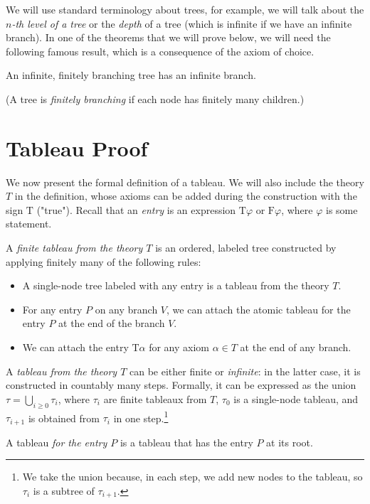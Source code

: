 We will use standard terminology about trees, for example, we will talk about the \emph{$n$-th level of a tree} or the \emph{depth} of a tree (which is infinite if we have an infinite branch). In one of the theorems that we will prove below, we will need the following famous result, which is a consequence of the axiom of choice.

\begin{lemma}
An infinite, finitely branching tree has an infinite branch.
\end{lemma}
\noindent (A tree is \emph{finitely branching} if each node has finitely many children.)


\section{Tableau Proof}

We now present the formal definition of a tableau. We will also include the theory $T$ in the definition, whose axioms can be added during the construction with the sign $\mathrm{T}$ ("true"). Recall that an \emph{entry} is an expression $\mathrm{T}\varphi$ or $\mathrm{F}\varphi$, where $\varphi$ is some statement.

\begin{definition}[Tableau]
A \emph{finite tableau from the theory $T$} is an ordered, labeled tree constructed by applying finitely many of the following rules:
\begin{itemize}
    \item A single-node tree labeled with any entry is a tableau from the theory $T$.
    \item For any entry $P$ on any branch $V$, we can attach the atomic tableau for the entry $P$ at the end of the branch $V$.
    \item We can attach the entry $\mathrm{T}\alpha$ for any axiom $\alpha \in T$ at the end of any branch.
\end{itemize}
A \emph{tableau from the theory $T$} can be either finite or \emph{infinite}: in the latter case, it is constructed in countably many steps. Formally, it can be expressed as the union $\tau = \bigcup_{i \geq 0} \tau_i$, where $\tau_i$ are finite tableaux from $T$, $\tau_0$ is a single-node tableau, and $\tau_{i+1}$ is obtained from $\tau_i$ in one step.\footnote{We take the union because, in each step, we add new nodes to the tableau, so $\tau_i$ is a subtree of $\tau_{i+1}$.}

A tableau \emph{for the entry $P$} is a tableau that has the entry $P$ at its root.
\end{definition}

